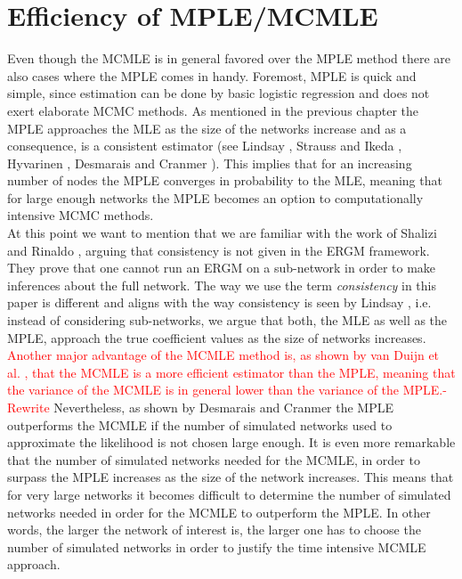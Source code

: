 \documentclass[headsepline=true, abstracton]{scrartcl}
\begin{document}
\section*{Efficiency of MPLE/MCMLE}
Even though the MCMLE is in general favored over the MPLE method there are also cases where the MPLE comes in handy. Foremost, MPLE is quick and simple, since estimation can be done by basic logistic regression and does not exert elaborate MCMC methods. As mentioned in the previous chapter the MPLE approaches the MLE as the size of the networks increase and as a consequence, is a consistent estimator (see Lindsay \cite{Lindsay1988}, Strauss and Ikeda \cite{StraussIkeda1990}, Hyvarinen \cite{Hyvarinen2006}, Desmarais and Cranmer \cite{Desmarais.2012}). This implies that for an increasing number of nodes the MPLE converges in probability to the MLE, meaning that for large enough networks the MPLE becomes an option to computationally intensive MCMC methods.\\
At this point we want to mention that we are familiar with the work of Shalizi and Rinaldo \cite{shalizi2013}, arguing that consistency is not given in the ERGM framework. They prove that one cannot run an ERGM on a sub-network in order to make inferences about the full network. 
The way we use the term \textit{consistency} in this paper is different and aligns with the way consistency is seen by Lindsay \cite{Lindsay1988}, i.e. instead of considering sub-networks, we argue that both, the MLE as well as the MPLE, approach the true coefficient values as the size of networks increases. \\%
\textcolor{red}{Another major advantage of the MCMLE method is, as shown by van Duijn et al. \cite{vanDuijnetal2009}, that the MCMLE is a more efficient estimator than the MPLE, meaning that the variance of the MCMLE is in general lower than the variance of the MPLE.-Rewrite} Nevertheless, as shown by Desmarais and Cranmer \cite{Desmarais.2012} the MPLE outperforms the MCMLE if the number of simulated networks used to approximate the likelihood is not chosen large enough. It is even more remarkable that the number of simulated networks needed for the MCMLE, in order to surpass the MPLE increases as the size of the network increases. This means that for very large networks it becomes difficult to determine the number of simulated networks needed in order for the MCMLE to outperform the MPLE. In other words, the larger the network of interest is, the larger one has to choose the number of simulated networks in order to justify the time intensive MCMLE approach.\\[0.3cm]
\end{document}
